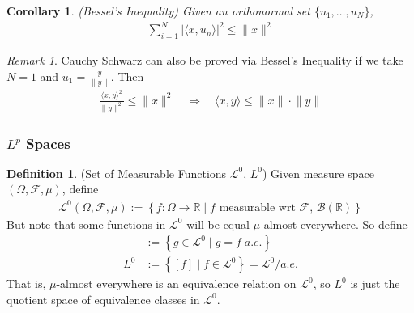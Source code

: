 \documentclass[12pt]{article}
\theoremstyle{plain}
\newtheorem{cor}[thm]{Corollary}
\theoremstyle{definition}
\newtheorem{defn}[thm]{Definition}
\theoremstyle{remark}
\newtheorem*{rmk}{Remark}
\newcommand{\ra}{\rightarrow}
\newcommand{\sF}{\mathscr{F}}
\newcommand{\sB}{\mathscr{B}}
\newcommand{\sL}{\mathscr{L}}
\newcommand{\R}{\mathbb{R}}
\begin{document}
\begin{cor}
\emph{(Bessel's Inequality)}
Given an orthonormal set $\{u_1,\ldots,u_N\}$,
\begin{align*}
    \sum_{i=1}^N
    \bigl\lvert\langle x,u_n\rangle\bigr\rvert^2
    \leq \lVert x\rVert^2
\end{align*}
\end{cor}

\begin{rmk}
Cauchy Schwarz can also be proved via Bessel's Inequality if we take
$N=1$ and $u_1=\frac{y}{\lVert y\rVert}$. Then
\begin{align*}
    \frac{\langle x,y\rangle^2}{\lVert y\rVert^2} \leq \lVert x\rVert^2
    \quad\Rightarrow\quad
    \langle x,y\rangle \leq \lVert x\rVert\cdot \lVert y\rVert
\end{align*}
\end{rmk}


\subsubsection{$L^p$ Spaces}

\begin{defn}(Set of Measurable Functions $\sL^0$, $L^0$)
Given measure space $(\Omega,\sF,\mu)$, define
\begin{align*}
  \sL^0(\Omega,\sF,\mu) :=
  \left\{ f:\Omega\ra\R \; |\; \text{$f$ measurable wrt $\sF$, $\sB(\R)$} \right\}
\end{align*}
But note that some functions in $\sL^0$ will be equal $\mu$-almost
everywhere. So define
\begin{align*}
  [f] &:= \left\{ g\in \sL^0 \;|\; g=f \; a.e. \right\} \\
  L^0 &:= \left\{ [f] \;|\; f\in\sL^0 \right\}
  = \sL^0 / a.e.
\end{align*}
That is, $\mu$-almost everywhere is an equivalence relation on
$\sL^0$, so $L^0$ is just the quotient space of equivalence classes in
$\sL^0$.
\end{defn}
\end{document}
